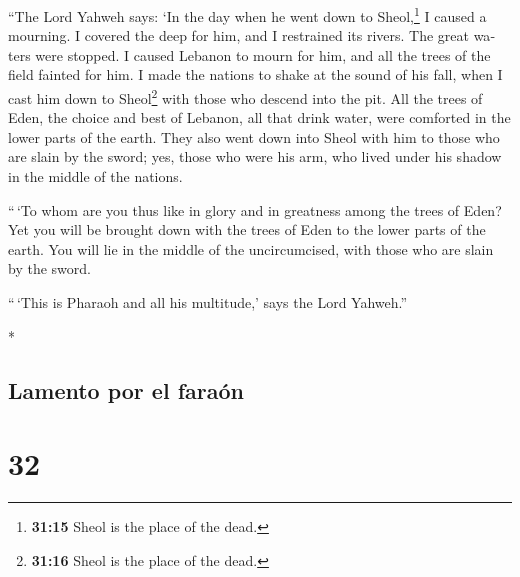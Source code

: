 \begin{paracol}{2}
\begin{otherlanguage}{english}
 ``The Lord Yahweh says: `In the day when he went down to
Sheol,\footnote{\textbf{31:15} Sheol is the place of the dead.} I caused
a mourning. I covered the deep for him, and I restrained its rivers. The
great waters were stopped. I caused Lebanon to mourn for him, and all
the trees of the field fainted for him.  I made the
nations to shake at the sound of his fall, when I cast him down to
Sheol\footnote{\textbf{31:16} Sheol is the place of the dead.} with
those who descend into the pit. All the trees of Eden, the choice and
best of Lebanon, all that drink water, were comforted in the lower parts
of the earth.  They also went down into Sheol with him to
those who are slain by the sword; yes, those who were his arm, who lived
under his shadow in the middle of the nations.

 ``\,`To whom are you thus like in glory and in greatness
among the trees of Eden? Yet you will be brought down with the trees of
Eden to the lower parts of the earth. You will lie in the middle of the
uncircumcised, with those who are slain by the sword.

``\,`This is Pharaoh and all his multitude,' says the Lord Yahweh.''

\end{otherlanguage}

\switchcolumn[0]*

\hypertarget{lamento-por-el-farauxf3n}{%
\subsection{Lamento por el faraón}\label{lamento-por-el-farauxf3n}}

\hypertarget{section-62}{%
\section{32}\label{section-62}}


\end{paracol}
